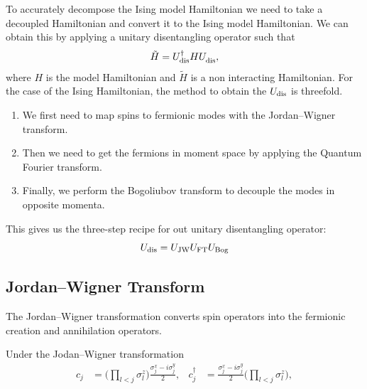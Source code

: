 \documentclass[12pt]{article}
\newcommand*{\iu}{i}
\begin{document}
  To accurately decompose the Ising model Hamiltonian we need to take a decoupled Hamiltonian and convert it to the Ising model Hamiltonian. We can obtain this by applying a unitary disentangling operator such that
  \begin{equation}
    \tilde{H}
      = U_{\textnormal{dis}}^{\dagger} H
        U_{\textnormal{dis}}^{\vphantom{\dagger}},
  \end{equation}
  where \( H \) is the model Hamiltonian and \( \tilde{H} \) is a non interacting Hamiltonian. For the case of the Ising Hamiltonian, the method to obtain the \( U_{\textnormal{dis}} \) is threefold.
  \begin{enumerate}
   \item We first need to map spins to fermionic modes with the Jordan--Wigner transform.
   \item Then we need to get the fermions in moment space by applying the Quantum Fourier transform.
   \item Finally, we perform the Bogoliubov transform to decouple the modes in opposite momenta.
  \end{enumerate}
  This gives us the three-step recipe for out unitary disentangling operator:
  \begin{equation}
    U_{\textnormal{dis}}
      = U_{\textnormal{JW}} U_{\textnormal{FT}} U_{\textnormal{Bog}}
  \end{equation}

  \subsection{Jordan--Wigner Transform}
  The Jordan--Wigner transformation converts spin operators into the fermionic creation and annihilation operators.

  Under the Jodan--Wigner transformation
  \begin{align}
    \label{eq:jordan-wigner}
    c_{j}
      &= \biggl( \prod_{l < j} \sigma_{l}^{z} \biggr)
         \frac{\sigma_{j}^{x} - \iu \sigma_{j}^{y}}{2},
    &
    c_{j}^{\dagger}
      &= \frac{\sigma^{x}_{j} - \iu \sigma^{y}_{j}}{2}
         \biggl( \prod_{l < j} \sigma^{z}_{l} \biggr),
  \end{align}
\end{document}
